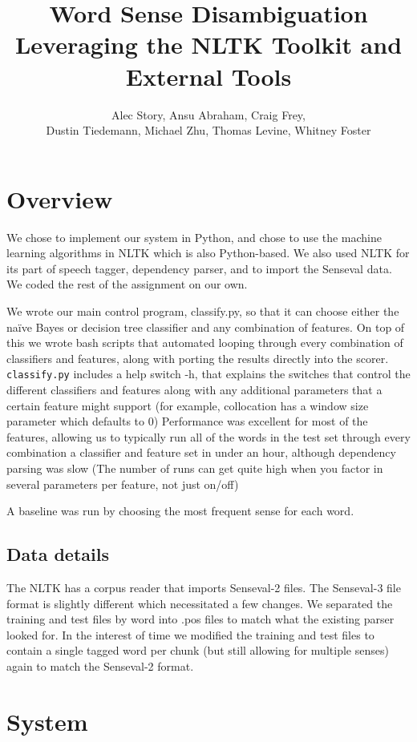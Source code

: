 \documentclass{article}
\title{Word Sense Disambiguation\\
\small{Leveraging the NLTK Toolkit and External Tools}}
\author{
Alec Story,
Ansu Abraham,
Craig Frey,\\
Dustin Tiedemann,
Michael Zhu,
Thomas Levine,
Whitney Foster\\
}
\newcommand{\naive}{na\"ive}
\begin{document}
\maketitle

\section{Overview}

We  chose to implement our system in Python, and chose to use the machine
learning algorithms in NLTK which is also Python-based.  We also used NLTK for
its part of speech tagger, dependency parser, and to import the Senseval data.
We coded the rest of the assignment on our own.

We wrote our main control program, classify.py, so that it can choose either the
\naive{} Bayes or decision tree classifier and any combination of  features. On
top of this we wrote bash scripts that automated looping through every
combination of classifiers and features, along with porting the results directly
into the scorer.  \verb+classify.py+ includes a help switch -h, that explains
the switches that control the different classifiers and features along with any
additional parameters that a certain feature might support (for example,
collocation has a window size parameter which defaults to 0) Performance was
excellent for most of the features, allowing us to typically run all of the
words in the test set through every combination a classifier and feature set in
under an hour, although dependency parsing was slow (The number of runs can get
quite high when you factor in several parameters per feature, not just on/off)

A baseline was run by choosing the most frequent sense for each word.

\subsection{Data details}

The NLTK has a corpus reader that imports Senseval-2 files. The Senseval-3
file format is slightly  different which necessitated a few changes. We
separated the training  and test files by word into .pos files to match  what
the existing parser looked for. In the interest of time we modified  the
training and test files to contain a single tagged word per chunk (but still
allowing for multiple senses) again to match the Senseval-2  format.


\section{System}
\end{document}

